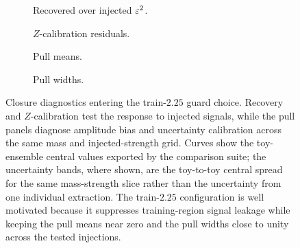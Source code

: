 \begin{figure}[H]
\centering
\begin{subfigure}[t]{0.49\linewidth}
  \centering
  \caption{Recovered over injected $\varepsilon^2$.}
\end{subfigure}
\hfill
\begin{subfigure}[t]{0.49\linewidth}
  \centering
  \caption{$Z$-calibration residuals.}
\end{subfigure}

\vspace{0.6em}

\begin{subfigure}[t]{0.49\linewidth}
  \centering
  \caption{Pull means.}
\end{subfigure}
\hfill
\begin{subfigure}[t]{0.49\linewidth}
  \centering
  \caption{Pull widths.}
\end{subfigure}
\caption{Closure diagnostics entering the train-$2.25$ guard choice. Recovery and $Z$-calibration test the response to injected signals, while the pull panels diagnose amplitude bias and uncertainty calibration across the same mass and injected-strength grid. Curves show the toy-ensemble central values exported by the comparison suite; the uncertainty bands, where shown, are the toy-to-toy central spread for the same mass-strength slice rather than the uncertainty from one individual extraction. The train-$2.25$ configuration is well motivated because it suppresses training-region signal leakage while keeping the pull means near zero and the pull widths close to unity across the tested injections.}
\label{fig:guard-band-closure-diagnostics}
\end{figure}

